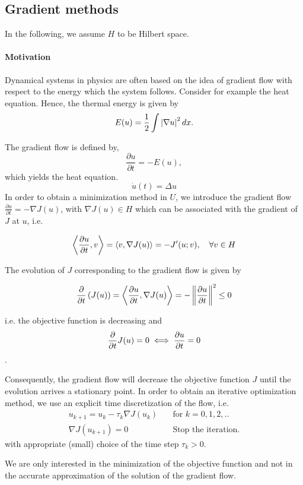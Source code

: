 \subsection{Gradient methods}
In the following, we assume $H$ to be Hilbert space.
\paragraph{Motivation}
	Dynamical systems in physics are often based on the idea of gradient flow with respect to the energy which the system follows. Consider for example the heat equation. Hence, the thermal energy is given by
	\[
		E(u)=\frac{1}{2}\int \left|\nabla u\right|^2 dx.
	\]
	
	The gradient flow is defined by,
	\[
		\frac{\partial u}{\partial t} = -E(u),
	\]
	which yields the heat equation.
	\[
		\dot{u}(t)=\Delta u
	\]
In order to obtain a minimization method in $U$, we introduce the gradient flow $\frac{\partial u}{\partial t} = -\nabla J(u)$, with $\nabla J(u)\in H$ which can be associated with the gradient of $J$ at $u$, i.e.

\[
	\left\langle \frac{\partial u}{{\partial t}}, v \right\rangle = \left\langle v, \nabla J(u)\right\rangle = -J'(u;v), \quad \forall v \in H
\]

The evolution of $J$ corresponding to the gradient flow is given by

\[
	\frac{\partial}{\partial t} \left(J(u)\right) = \left\langle \frac{\partial u}{{\partial t}}, \nabla J(u) \right\rangle = -\left\lVert\frac{\partial u}{{\partial t}}\right\rVert^2 \leq 0
\]

i.e. the objective function is decreasing and \[\frac{\partial }{{\partial t}} J(u) =0 \iff \frac{\partial u}{{\partial t}}=0\].

Consequently, the gradient flow will decrease the objective function $J$ until the evolution arrives a stationary point. In order to obtain an iterative optimization method, we use an explicit time discretization of the flow, i.e.
\begin{align*}
u_{k+1}=u_k - \tau_k\nabla J(u_k) &\quad \text{for } k=0,1,2,.. \\
\nabla J(u_{k+1})=0 &\quad \text{Stop the iteration.}
\end{align*}
with appropriate (small) choice of the time step $\tau_k >0$. 
\begin{remark}
We are only interested in the minimization of the objective function and not in the accurate approximation of the solution of the gradient flow.
\end{remark}


